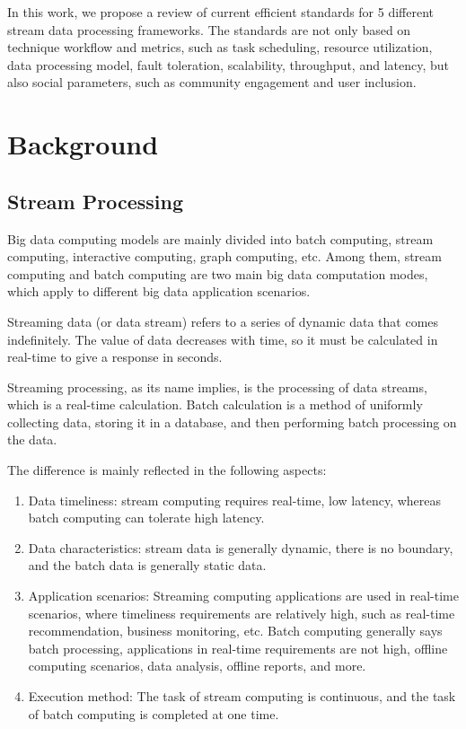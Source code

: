 \documentclass[pdftex,twocolumn,10pt,letterpaper]{article}
\begin{document}
In this work, we propose a review of current efficient standards for 5 different stream data processing frameworks. The standards are not only based on technique workflow and metrics, such as task scheduling, resource utilization, data processing model, fault toleration, scalability, throughput, and latency, but also social parameters, such as community engagement and user inclusion.



\section{Background}

\subsection{Stream Processing}
Big data computing models are mainly divided into batch computing, stream computing, interactive computing, graph computing, etc. Among them, stream computing and batch computing are two main big data computation modes, which apply to different big data application scenarios. 

Streaming data (or data stream) refers to a series of dynamic data that comes indefinitely. The value of data decreases with time, so it must be calculated in real-time to give a response in seconds. 

Streaming processing, as its name implies, is the processing of data streams, which is a real-time calculation. Batch calculation is a method of uniformly collecting data, storing it in a database, and then performing batch processing on the data. 

The difference is mainly reflected in the following aspects: 

\begin{enumerate}
    \item Data timeliness: stream computing requires real-time, low latency, whereas batch computing can tolerate high latency. 
    
    \item Data characteristics: stream data is generally dynamic, there is no boundary, and the batch data is generally static data. 
    
    \item Application scenarios: Streaming computing applications are used in real-time scenarios, where timeliness requirements are relatively high, such as real-time recommendation, business monitoring, etc. Batch computing generally says batch processing, applications in real-time requirements are not high, offline computing scenarios, data analysis, offline reports, and more. 
    
    \item Execution method: The task of stream computing is continuous, and the task of batch computing is completed at one time.
\end{enumerate}
\end{document}
